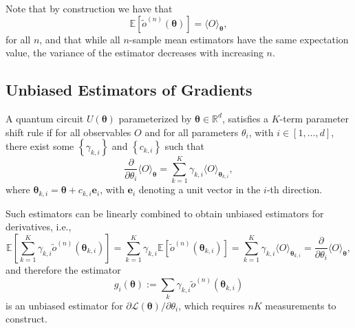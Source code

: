 \documentclass[
        11pt, %
	a4paper, %
]{LegrandOrangeBook}
\begin{document}
Note that by construction we have that
\begin{equation}
    \mathbb{E}\left[\tilde{o}^{(n)}(\boldsymbol{\theta})\right]=\langle O\rangle_{\boldsymbol{\theta}},
\end{equation}
for all $n$, and that while all $n$-sample mean estimators have the same expectation value, the variance of the estimator decreases with increasing $n$.

\subsection{Unbiased Estimators of Gradients}

\begin{definition}
    A quantum circuit $U(\boldsymbol{\theta})$ parameterized by $\boldsymbol{\theta} \in \mathbb{R}^d$, satisfies a $K$-term parameter shift rule if for all observables $O$ and for all parameters $\theta_i$, with $i \in[1, \ldots, d]$, there exist some $\left\{\gamma_{k, i}\right\}$ and $\left\{c_{k, i}\right\}$ such that
    \begin{equation}
    \frac{\partial}{\partial \theta_i}\langle O\rangle_{\boldsymbol{\theta}}=\sum_{k=1}^K \gamma_{k, i}\langle O\rangle_{\boldsymbol{\theta}_{k, i}},
\end{equation}
where $\boldsymbol{\theta}_{k, i}=\boldsymbol{\theta}+c_{k, i} \boldsymbol{e}_i$, with $\boldsymbol{e}_i$ denoting a unit vector in the $i$-th direction.
\end{definition}

Such estimators can be linearly combined to obtain unbiased estimators for derivatives, i.e.,
\begin{equation}
    \mathbb{E}\left[\sum_{k=1}^K \gamma_{k, i} \tilde{o}^{(n)}\left(\boldsymbol{\theta}_{k, i}\right)\right]=\sum_{k=1}^K \gamma_{k, i} \mathbb{E}\left[\tilde{o}^{(n)}\left(\boldsymbol{\theta}_{k, i}\right)\right]=\sum_{k=1}^K \gamma_{k, i}\langle O\rangle_{\boldsymbol{\theta}_{k, i}}=\frac{\partial}{\partial \theta_i}\langle O\rangle_{\boldsymbol{\theta}},
\end{equation}
and therefore the estimator 
\begin{equation}
    g_i(\boldsymbol{\theta}):=\sum_k \gamma_{k, i} \tilde{o}^{(n)}\left(\boldsymbol{\theta}_{k, i}\right)
\end{equation}
is an unbiased estimator for $\partial \mathcal{L}(\boldsymbol{\theta}) / \partial \theta_i$, which requires $n K$ measurements to construct. 
\end{document}

